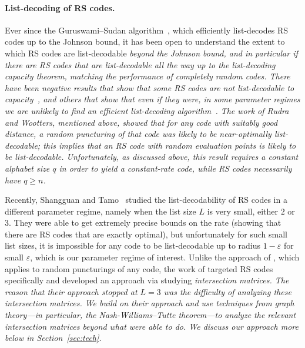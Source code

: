 \documentclass[11pt]{article}
\renewcommand{\epsilon}{\varepsilon}
\newcommand{\eps}{\epsilon}
\newcommand{\mkw}[1]{{\color{orange}{\small [Mary: #1]}}}
\begin{document}
\paragraph{List-decoding of RS codes.} Ever since the Guruswami--Sudan algorithm~\cite{gurus}, which efficiently list-decodes RS codes up to the Johnson bound, it has been open to understand the extent to which RS codes are list-decodable \em beyond \em the Johnson bound, and in particular if there are RS codes that are list-decodable all the way up to the list-decoding capacity theorem, matching the performance of completely random codes.  There have been negative results that show that \em some \em RS codes are not list-decodable to capacity~\cite{Ben-Sasson}, and others that show that even if they were, in some parameter regimes we are unlikely to find an efficient list-decoding algorithm~\cite{list-dec-discrete-log}.  The work of Rudra and Wootters, mentioned above, showed that for any code with suitably good distance, a random puncturing of that code was likely to be near-optimally list-decodable; this implies that an RS code with random evaluation points is likely to be list-decodable.  Unfortunately, as discussed above, this result requires a constant alphabet size $q$ in order to yield a constant-rate code, while RS codes necessarily have $q \geq n$.

Recently, Shangguan and Tamo~\cite{shangguan2019combinatorial0} studied the list-decodability of RS codes in a different parameter regime, namely when the list size $L$ is very small, either $2$ or $3$.
They were able to get extremely precise bounds on the rate (showing that there are RS codes that are exactly optimal), but unfortunately for such small list sizes, it is impossible for any code to be list-decodable up to radius $1 - \eps$ for small $\eps$, which is our parameter regime of interest.
Unlike the approach of \cite{Rudra-Wootters}, which applies to random puncturings of any code, the work of \cite{shangguan2019combinatorial0} targeted RS codes specifically and developed an approach via studying \em intersection matrices. \em  The reason that their approach stopped at $L=3$ was the difficulty of analyzing these intersection matrices.  We build on their approach and use techniques from graph theory---in particular, the Nash-Williams--Tutte theorem---to analyze the relevant intersection matrices beyond what \cite{shangguan2019combinatorial0} were able to do.  We discuss our approach more below in Section~\ref{sec:tech}.

\end{document}
